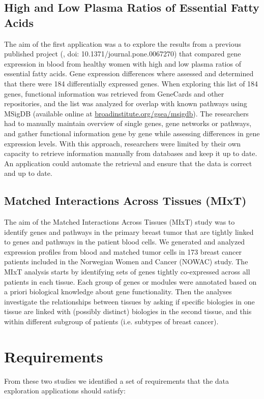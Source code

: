 \subsection{High and Low Plasma Ratios of Essential Fatty Acids} 
The aim of the first application was a to explore the
results from a previous published project (\cite{olsen2013plasma}, doi:
10.1371/journal.pone.0067270) that compared gene expression in blood from
healthy women with high and low plasma ratios of essential fatty acids. Gene
expression differences where assessed and determined that there were 184
differentially expressed genes. When exploring this list of 184 genes,
functional information was retrieved from GeneCards and other repositories, and
the list was analyzed for overlap with known pathways using MSigDB (available
online at
\href{broadinstitute.org/gsea/msigdb}{broadinstitute.org/gsea/msigdb}). The
researchers had to manually maintain overview of single genes, gene networks or
pathways, and gather functional information gene by gene while assessing
differences in gene expression levels. With this approach, researchers were
limited by their own capacity to retrieve information manually from databases
and keep it up to date. An application could automate the retrieval and ensure
that the data is correct and up to date. 

\subsection{Matched Interactions Across Tissues (MIxT)}
The aim of the Matched Interactions Across Tissues (MIxT) study was to identify
genes and pathways in the primary breast tumor that are tightly linked to genes
and pathways in the patient blood cells.\cite{dumeaux2017interactions} We
generated and analyzed expression profiles from blood and matched tumor cells in
173 breast cancer patients included in the Norwegian Women and Cancer (NOWAC)
study.  The MIxT analysis starts by identifying sets of genes tightly
co-expressed across all patients in each tissue. Each group of genes or modules
were annotated based on a priori biological knowledge about gene functionality.
Then the analyses investigate the relationships between tissues by asking if
specific biologies in one tissue are linked with (possibly distinct) biologies
in the second tissue, and this within different subgroup of patients (i.e.
subtypes of breast cancer).


\section{Requirements} 
From these two studies we identified a set of requirements that the data
exploration applications should satisfy: 


